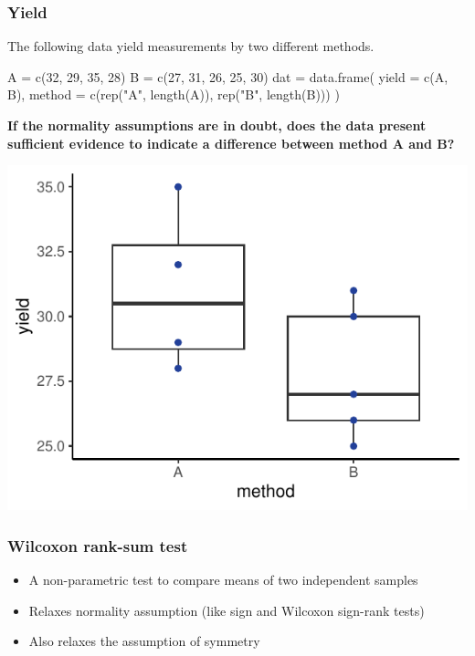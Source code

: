 \documentclass[a4paper]{article}
\begin{document}
\subsubsection{Yield}
The following data yield measurements by two different methods.
\begin{Schunk}
\begin{Sinput}
A = c(32, 29, 35, 28)
B = c(27, 31, 26, 25, 30)
dat = data.frame(
	yield = c(A, B),
	method = c(rep("A", length(A)),
        	   rep("B", length(B)))
)
\end{Sinput}
\end{Schunk}
\begin{greenbox}
	\textbf{If the normality assumptions are in doubt, does the data present sufficient evidence to indicate a 	difference between method A and B?}
\end{greenbox}
\begin{Schunk}


{\centering \includegraphics[width=\maxwidth]{figure/listings-unnamed-chunk-116-1} 

}

\end{Schunk}
\subsubsection{Wilcoxon rank-sum test}
\begin{itemize}
	\item A non-parametric test to compare means of two independent samples
	\item Relaxes normality assumption (like sign and Wilcoxon sign-rank tests)
	\item Also relaxes the assumption of symmetry
\end{itemize}
\end{document}
